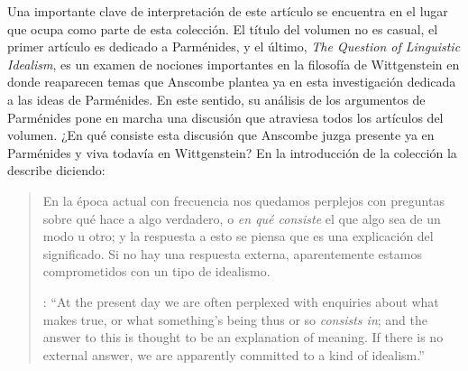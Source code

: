 Una importante clave de interpretación de este artículo se encuentra en el lugar que ocupa como parte de esta colección. El título del volumen no es casual, el primer artículo es dedicado a Parménides, y el último, \emph{The Question of Linguistic Idealism}, es un examen de nociones importantes en la filosofía de Wittgenstein en donde reaparecen temas que Anscombe plantea ya en esta investigación dedicada a las ideas de Parménides. En este sentido, su análisis de los argumentos de Parménides pone en marcha una discusión que atraviesa todos los artículos del volumen. ¿En qué consiste esta discusión que Anscombe juzga presente ya en Parménides y viva todavía en Wittgenstein? En la introducción de la colección la describe diciendo: \blockquote[{\cite[xi]{anscombe1981parmenides}}: \enquote{At the present day we are often perplexed with enquiries about what makes true, or what something's being thus or so \emph{consists in}; and the answer to this is thought to be an explanation of meaning. If there is no external answer, we are apparently committed to a kind of idealism.}]{En la época actual con frecuencia nos quedamos perplejos con preguntas sobre qué hace a algo verdadero, o \emph{en qué consiste} el que algo sea de un modo u otro; y la respuesta a esto se piensa que es una explicación del significado. Si no hay una respuesta externa, aparentemente estamos comprometidos con un tipo de idealismo.}

